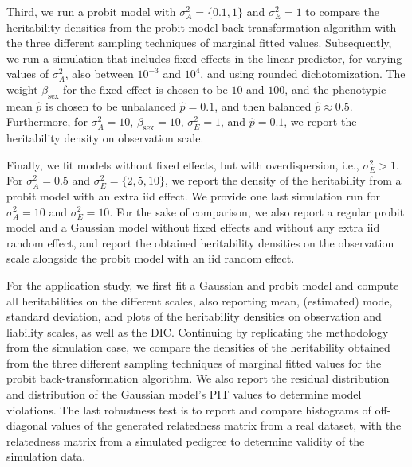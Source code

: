 Third, we run a probit model with $\sigma^2_A=\{0.1, 1\}$ and $\sigma^2_E=1$ to compare the heritability densities from the probit model back-transformation algorithm with the three different sampling techniques of marginal fitted values.
Subsequently, we run a simulation that includes fixed effects in the linear predictor, for varying values of $\sigma^2_A$, also between $10^{-3}$ and $10^4$, and using rounded dichotomization. The weight $\beta_\text{sex}$ for the fixed effect is chosen to be $10$ and $100$, and the phenotypic mean $\hat p$ is chosen to be unbalanced $\hat p=0.1$, and then balanced $\hat p\approx 0.5$. Furthermore, for $\sigma^2_A=10$, $\beta_\text{sex}=10$, $\sigma^2_E=1$, and $\hat p=0.1$, we report the heritability density on observation scale.

Finally, we fit models without fixed effects, but with overdispersion, i.e., $\sigma^2_E>1$. For $\sigma^2_A=0.5$ and $\sigma^2_E=\{2, 5, 10\}$, we report the density of the heritability from a probit model with an extra iid effect. We provide one last simulation run for $\sigma^2_A=10$ and $\sigma^2_E=10$. For the sake of comparison, we also report a regular probit model and a Gaussian model without fixed effects and without any extra iid random effect, and report the obtained heritability densities on the observation scale alongside the probit model with an iid random effect.

For the application study, we first fit a Gaussian and probit model and compute all heritabilities on the different scales, also reporting mean, (estimated) mode, standard deviation, and plots of the heritability densities on observation and liability scales, as well as the DIC. Continuing by replicating the methodology from the simulation case, we compare the densities of the heritability obtained from the three different sampling techniques of marginal fitted values for the probit back-transformation algorithm. We also report the residual distribution and distribution of the Gaussian model's PIT values to determine model violations. The last robustness test is to report and compare histograms of off-diagonal values of the generated relatedness matrix from a real dataset, with the relatedness matrix from a simulated pedigree to determine validity of the simulation data.

